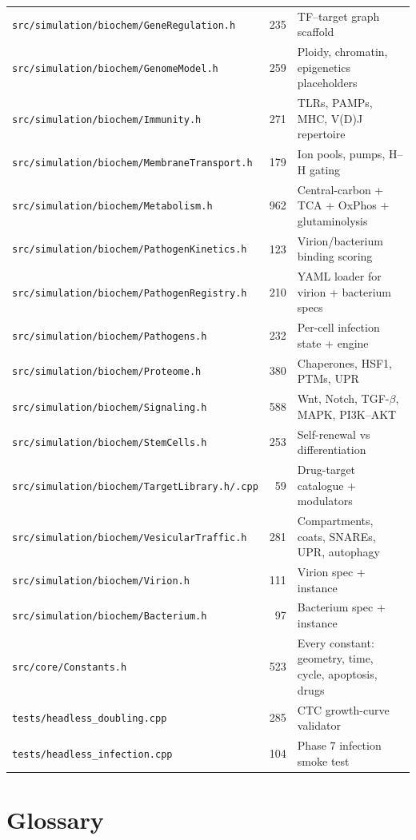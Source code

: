 \documentclass[11pt,letterpaper,twoside,openany]{book}
\newcommand{\file}[1]{\texttt{\small#1}}
\begin{document}
\begin{longtable}{lrp{8cm}}
\file{src/simulation/biochem/GeneRegulation.h} & 235  & TF--target graph scaffold\\
\file{src/simulation/biochem/GenomeModel.h}    & 259  & Ploidy, chromatin, epigenetics placeholders\\
\file{src/simulation/biochem/Immunity.h}       & 271  & TLRs, PAMPs, MHC, V(D)J repertoire\\
\file{src/simulation/biochem/MembraneTransport.h} & 179 & Ion pools, pumps, H--H gating\\
\file{src/simulation/biochem/Metabolism.h}     & 962  & Central-carbon + TCA + OxPhos + glutaminolysis\\
\file{src/simulation/biochem/PathogenKinetics.h}&123  & Virion/bacterium binding scoring\\
\file{src/simulation/biochem/PathogenRegistry.h}&210  & YAML loader for virion + bacterium specs\\
\file{src/simulation/biochem/Pathogens.h}      & 232  & Per-cell infection state + engine\\
\file{src/simulation/biochem/Proteome.h}       & 380  & Chaperones, HSF1, PTMs, UPR\\
\file{src/simulation/biochem/Signaling.h}      & 588  & Wnt, Notch, TGF-$\beta$, MAPK, PI3K--AKT\\
\file{src/simulation/biochem/StemCells.h}      & 253  & Self-renewal vs differentiation\\
\file{src/simulation/biochem/TargetLibrary.h/.cpp}& 59 & Drug-target catalogue + modulators\\
\file{src/simulation/biochem/VesicularTraffic.h} & 281 & Compartments, coats, SNAREs, UPR, autophagy\\
\file{src/simulation/biochem/Virion.h}         & 111  & Virion spec + instance\\
\file{src/simulation/biochem/Bacterium.h}      &  97  & Bacterium spec + instance\\
\file{src/core/Constants.h}                    & 523  & Every constant: geometry, time, cycle, apoptosis, drugs\\
\file{tests/headless\_doubling.cpp}            & 285  & CTC growth-curve validator\\
\file{tests/headless\_infection.cpp}           & 104  & Phase 7 infection smoke test\\
\bottomrule
\end{longtable}

\chapter{Glossary}
\label{app:glossary}
\end{document}
